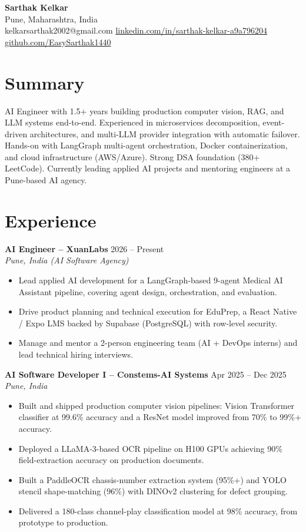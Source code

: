 \documentclass[9.5pt,a4paper]{article}
\newcommand{\resumeItem}[1]{\item[--] #1}
\newcommand{\resumeEntry}[4]{
  \textbf{#1} \hfill #2 \\
  \textit{#3} \hfill \textit{#4}
}
\begin{document}
\begin{center}
{\huge \bfseries Sarthak Kelkar} \\[2pt]
Pune, Maharashtra, India \\[1pt]
kelkarsarthak2002@gmail.com  \quad
\href{https://linkedin.com/in/sarthak-kelkar-a9a796204}{linkedin.com/in/sarthak-kelkar-a9a796204} \quad
\href{https://github.com/EasySarthak1440}{github.com/EasySarthak1440}
\end{center}

\vspace{-10pt}
\section*{Summary}
AI Engineer with 1.5+ years building production computer vision, RAG, and LLM systems end-to-end. Experienced in microservices decomposition, event-driven architectures, and multi-LLM provider integration with automatic failover. Hands-on with LangGraph multi-agent orchestration, Docker containerization, and cloud infrastructure (AWS/Azure). Strong DSA foundation (380+ LeetCode). Currently leading applied AI projects and mentoring engineers at a Pune-based AI agency.

\section*{Experience}
\resumeEntry{AI Engineer -- XuanLabs}{2026 -- Present}{Pune, India (AI Software Agency)}{}
\begin{itemize}[leftmargin=14pt, itemsep=1pt, topsep=2pt]
  \resumeItem{Lead applied AI development for a LangGraph-based 9-agent Medical AI Assistant pipeline, covering agent design, orchestration, and evaluation.}
  \resumeItem{Drive product planning and technical execution for EduPrep, a React Native / Expo LMS backed by Supabase (PostgreSQL) with row-level security.}
  \resumeItem{Manage and mentor a 2-person engineering team (AI + DevOps interns) and lead technical hiring interviews.}
\end{itemize}

\resumeEntry{AI Software Developer I -- Constems-AI Systems}{Apr 2025 -- Dec 2025}{Pune, India}{}
\begin{itemize}[leftmargin=14pt, itemsep=1pt, topsep=2pt]
  \resumeItem{Built and shipped production computer vision pipelines: Vision Transformer classifier at 99.6\% accuracy and a ResNet model improved from 70\% to 99\%+ accuracy.}
  \resumeItem{Deployed a LLaMA-3-based OCR pipeline on H100 GPUs achieving 90\% field-extraction accuracy on production documents.}
  \resumeItem{Built a PaddleOCR chassis-number extraction system (95\%+) and YOLO stencil shape-matching (96\%) with DINOv2 clustering for defect grouping.}
  \resumeItem{Delivered a 180-class channel-play classification model at 98\% accuracy, from prototype to production.}
\end{itemize}
\end{document}
